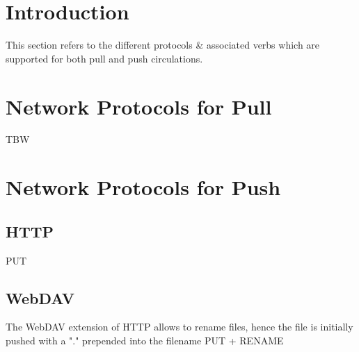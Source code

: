 \documentclass[dec_sum_main.tex]{subfiles}
\begin{document}
\section{Introduction}
This section refers to the different protocols \& associated verbs which are supported for both pull and push circulations.


\section{Network Protocols for Pull}
TBW

\section{Network Protocols for Push}

\subsection{HTTP}
PUT

\subsection{WebDAV}
The WebDAV extension of HTTP allows to rename files, hence the file is initially pushed with a "." prepended into the filename 
PUT + RENAME
\end{document}
